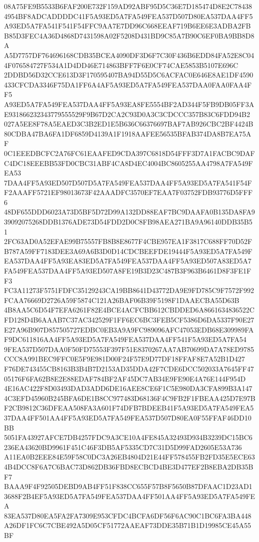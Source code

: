 \documentclass[UTF8,fontset=fandol,zihao=-4,a4paper]{ctexart}
\begin{document}
{{08A75FE9B5533B6FAF200E732F159AD92ABF95D5C36E7D185474D8E2C784384954BF8ADCADDDDC41F5A93ED5A7FA549FEA537D507D80EA537DAA4FF5
A93ED5A7FA541F541F54FFC9AA7E7DD96C668EEAF719B6EE6E3ADBA2FBB85D3FEC4A36D4868D7431598A02F5208D431BD9C85A7B90C6EF0BA9BB8D8A
A5D7757DF764696168CDB35BCEA4090DF3D6F7C30F436B6EDD84FA52E8C044F076584727F534A1D4DD46E714863BFF7F6E0CF74CAE5853B5107E696C
2DDBD56D32CCE613D3F170595407BA94D55D5C6ACFAC0E646E8AE1DF4590433CFCDA3346F75DA1FF6A4AF5A93ED5A7FA549FEA537DAA0FAA0FAA4FF5
A93ED5A7FA549FEA537DAA4FF5A93EA8FE5554BF2AD344F5FB9DB05FF3AE931866232343779555529F9B67D2CA2C93D0A3C3CDCCC357B83C6FDD94B2
027A5EE8F78A5EAED3C3B2ED1E5B636C66376697BAF7AB926CBC2BF4424B80CDBA47BA6FA1DF6859D4139A1F1918AAFEE56535BFAB374DA8B7EA75AF
0C1EEEDBCFC2A76FC61EAAFED9CDA397C6818D54FFF3D7A1FACBC9DAFC4DC18EEEBB53FD0CBC31ABF4CA8D4EC4004BC8605255AA4798A7FA549FEA53
7DAA4FF5A93ED507D507D5A7FA549FEA537DAA4FF5A93ED5A7FA541F54FF2AAAFF5721EF98013673F42AAADFC3570EF7EAA7F03752FDB93776D5FFF6
48DF655DDD6023A73D5BF5D72D99A132DD88EAF7BC9DAAFA0B135DA8FA939092075268DDB1376ADE73D54FDD2D0C8FB98AEA271BA9A96140DDB35B51
2FC63AD0A52EFAE99B75557FB8B8E8677F4CBE957EA1F3817C688FF70D52FB787A59FF7183DEE3A69A6B3D0D14CDCBEEFDE19444F5A93ED5A7FA549F
EA537DAA4FF5A93EA83ED5A7FA549FEA537DAA4FF5A93ED507A83ED5A7FA549FEA537DAA4FF5A93ED507A8FE19B3D23C487B3F963B6461D8F3FE1FF3
FC3A11273F5751FDFC35129243CA19BB8641D43772DA9E9FD785C9F7572F992FCAA76669D2726A59F5874C121A26BAF06B39F5198F1DAAECBA55D63B
4B8AA5C6D54F7EFA6261F82E4BCE4ACFCBB612CBDDED6A8661634836522CFD128D4B6AAAB7C37AC342529F1FF6EC6BC3FEB5CF5386D6DA5337F90E27
E27A96B907D857505727EDBC0EB3A9A9FC989096AFC47053EDB68E309989FAF9DC611816AA4FF5A93ED5A7FA549FEA537DAA4FF541F5A93ED5A7FA54
9FEA537D507DAA0F50FD75553F397F51E8370267AA7AB70699DA7A78ED9785CCC8A991BEC9FFC0E5F9E981D00F24F57E9D77DF18FFAF8E7A52B1D427
F76DE743455CB8163B3B4B7D2153AD35DDA42F7CDE6DCC502033A7645FF4705176F6FA62B8E2E88EDAF784BF2AF45DC7AB34E9FE90E4A76E144F954D
4E16AC422F8D03493DAD3ADD6DE16AEE8CE6F1C5E980DA3CFA899B3A1474C3EFD45960B245BFA6DE1B8CC977483D68136F4C9FB2F1FBEAA425D7E97B
F2CB9812C36DFEAA508FA3A601F74DFB7BDEEB41F5A93ED5A7FA549FEA537DAA4FF501AA4FF5A93ED5A7FA549FEA537D507D80EA0F55FFAF46DD10BB
5051FA43927AFCE7DB4257FDC9A3CE10A4FE845A32493D934B3239DC15BC6236EA43620BD9961F451C46F3DB5AF5335CD7C31D5D99FAD2605E53A736
A11EA0B2EEE84E59F58C0DC3A26EB4804D21E44FF578455FB2FD35E5ECE634B4DCC8F6A7C6BAC73D862DB36FBD8ECBCD4BE3D477EF2B8EBA2DB35BF7
BAAA9F4F92505DEBD9AB4FF51F838CC655F57B8F5650B87DFAAC1D23AD13688F2B4EF5A93ED5A7FA549FEA537DAA4FF501AA4FF5A93ED5A7FA549FEA
83EA537D80EA5FA2FA7309E953CFDC4BCFA6DF56F6AC90C1BC6FA3BA448A26DF1FC6C7CBE492A5D05CF51772AAEAF73DDE35B71B1D19985CE45A55BF
}}
\end{document}
